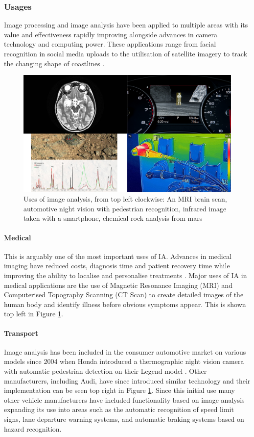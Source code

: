 	\subsubsection{Usages}
		Image processing and image analysis have been applied to multiple areas with its value and effectiveness rapidly improving alongside advances in camera technology and computing power. These applications range from facial recognition in social media uploads \citep{zuckerberg2011tagging} to the utilisation of satellite imagery to track the changing shape of coastlines \citep{costalimagery}.
		\begin{figure}[h!]
			\centering
			\includegraphics[width=15cm]{../images/4panel.png}
			\caption[Uses of image analysis]{Uses of image analysis, from top left clockwise: An MRI brain scan, automotive night vision with pedestrian recognition, infrared image taken with a smartphone, chemical rock analysis from mars}
			\label{fig:analysis_uses}
		\end{figure}
		\paragraph{Medical}
			This is arguably one of the most important uses of IA. Advances in medical imaging have reduced costs, diagnosis time and patient recovery time while improving the ability to localise and personalise treatments \citep{esfmedical}. Major uses of IA in medical applications are the use of Magnetic Resonance Imaging (MRI) and Computerised Topography Scanning (CT Scan) to create detailed images of the human body and identify illness before obvious symptoms appear. This is shown top left in Figure \ref{fig:analysis_uses}.
		\paragraph{Transport}
			Image analysis has been included in the consumer automotive market on various models since 2004 when Honda introduced a thermographic night vision camera with automatic pedestrian detection on their Legend model \citep{hondanightvision}. Other manufacturers, including Audi, have since introduced similar technology and their implementation can be seen top right in Figure \ref{fig:analysis_uses}. Since this initial use many other vehicle manufacturers have included functionality based on image analysis expanding its use into areas such as the automatic recognition of speed limit signs, lane departure warning systems, and automatic braking systems based on hazard recognition.
